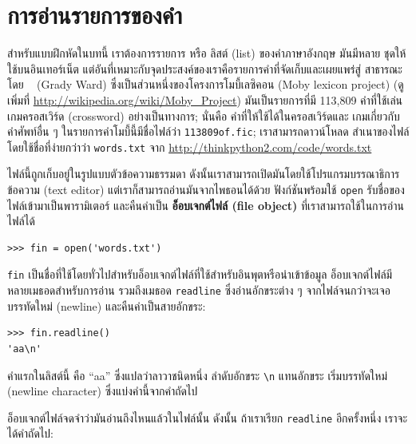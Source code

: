 \section{การอ่านรายการของคำ}%
\label{wordlist}

สำหรับแบบฝึกหัดในบทนี้ เราต้องการรายการ หรือ ลิสต์ (list) ของคำภาษาอังกฤษ มันมีหลาย
ชุดให้ใช้บนอินเทอร์เน็ต แต่อันที่เหมาะกับจุดประสงค์ของเราคือรายการคำที่จัดเก็บและเผยแพร่สู่
สาธารณะโดย ~ (Grady Ward) ซึ่งเป็นส่วนหนึ่งของโครงการโมบี้เลซิคอน (Moby lexicon project)
(ดูเพิ่มที่ \url{http://wikipedia.org/wiki/Moby_Project}) มันเป็นรายการที่มี 113,809 
คำที่ใช้เล่นเกมครอสเวิร์ด (crossword) อย่างเป็นทางการ; นั่นคือ คำที่ให้ใช้ได้ในครอสเวิร์ดและ
เกมเกี่ยวกับคำศัพท์อื่น ๆ  ในรายการคำโมบี้นี้มีชื่อไฟล์ว่า {\tt 113809of.fic}; เราสามารถดาวน์โหลด
สำเนาของไฟล์โดยใช้ชื่อที่ง่ายกว่าว่า {\tt words.txt} จาก \url{http://thinkpython2.com/code/words.txt}

ไฟล์นี้ถูกเก็บอยู่ในรูปแบบตัวข้อความธรรมดา 
ดังนั้นเราสามารถเปิดมันโดยใช้โปรแกรมบรรณาธิการข้อความ (text editor) แต่เราก็สามารถอ่านมันจากไพธอนได้ด้วย
ฟังก์ชันพร้อมใช้ {\tt open} รับชื่อของไฟล์เข้ามาเป็นพารามิเตอร์ และคืนค่าเป็น 
{\bf อ็อบเจกต์ไฟล์ (file object)} ที่เราสามารถใช้ในการอ่านไฟล์ได้

\begin{verbatim}
>>> fin = open('words.txt')
\end{verbatim}
%
{\tt fin} เป็นชื่อที่ใช้โดยทั่วไปสำหรับอ็อบเจกต์ไฟล์ที่ใช้สำหรับอินพุตหรือนำเข้าข้อมูล 
อ็อบเจกต์ไฟล์มีหลายเมธอดสำหรับการอ่าน รวมถึงเมธอด {\tt readline} 
ซึ่งอ่านอักขระต่าง ๆ จากไฟล์จนกว่าจะเจอบรรทัดใหม่ (newline) และคืนค่าเป็นสายอักขระ:

\begin{verbatim}
>>> fin.readline()
'aa\n'
\end{verbatim}
%
คำแรกในลิสต์นี้ คือ ``aa'' ซึ่งแปลว่าลาวาชนิดหนึ่ง ลำดับอักขระ \verb"\n" แทนอักขระ
เริ่มบรรทัดใหม่ (newline character) ซึ่งแบ่งคำนี้จากคำถัดไป

อ็อบเจกต์ไฟล์จดจำว่ามันอ่านถึงไหนแล้วในไฟล์นั้น  ดังนั้น ถ้าเราเรียก {\tt readline} 
อีกครั้งหนึ่ง เราจะได้คำถัดไป:

